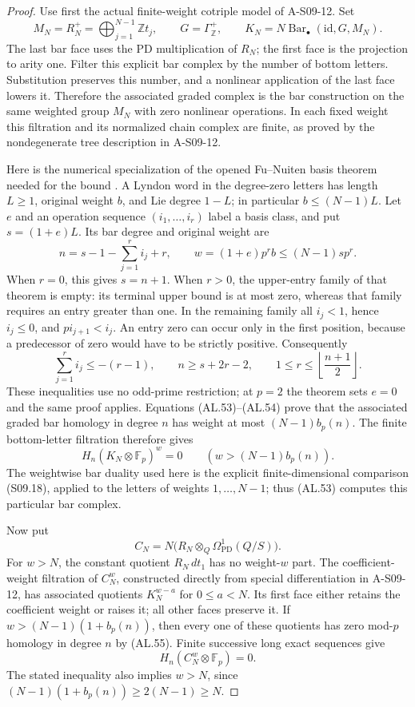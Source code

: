 \begin{proof}
Use first the actual finite-weight cotriple model
of A-S09-12.  Set
\[
 M_N=R_N^+=\bigoplus_{j=1}^{N-1}\mathbb Zt_j,
 \qquad G=\Gamma^+_{\mathbb Z},\qquad
 K_N=N\operatorname{Bar}_{\bullet}(\mathrm{id},G,M_N).
\]
The last bar face uses the PD multiplication of $R_N$;
the first face is the projection to arity one.
Filter this explicit bar complex by the number of
bottom letters.  Substitution preserves this number,
and a nonlinear application of the last face lowers
it.  Therefore the associated graded complex is the
bar construction on the same weighted group $M_N$
with zero nonlinear operations.  In each fixed
weight this filtration and its normalized chain
complex are finite, as proved by the nondegenerate
tree description in A-S09-12.

Here is the numerical specialization of the opened
Fu--Nuiten basis theorem needed for the bound
\cite[Theorem C, p.~6; Theorem 4.2, p.~40]{FuNuiten2026_check}.
A Lyndon word in the degree-zero letters has length
$L\geq1$, original weight $b$, and Lie degree $1-L$;
in particular $b\leq(N-1)L$.
Let $e$ and an operation sequence $(i_1,\ldots,i_r)$
label a basis class, and put $s=(1+e)L$.
Its bar degree and original weight are
\[
        n=s-1-\sum_{j=1}^r i_j+r,
        \qquad w=(1+e)p^r b\leq(N-1)s p^r.
 \tag{AL.53}
\]
When $r=0$, this gives $s=n+1$.
When $r>0$, the upper-entry family of that theorem
is empty: its terminal upper bound is at most zero,
whereas that family requires an entry greater than
one.  In the remaining family all $i_j<1$, hence
$i_j\leq0$, and $p i_{j+1}<i_j$.
An entry zero can occur only in the first position,
because a predecessor of zero would have to be
strictly positive.  Consequently
\[
        \sum_{j=1}^r i_j\leq-(r-1),\qquad
        n\geq s+2r-2,\qquad
        1\leq r\leq\left\lfloor\frac{n+1}{2}\right\rfloor.
 \tag{AL.54}
\]
These inequalities use no odd-prime restriction;
at $p=2$ the theorem sets $e=0$ and the same proof
applies.  Equations (AL.53)--(AL.54) prove that
the associated graded bar homology in degree $n$
has weight at most $(N-1)b_p(n)$.
The finite bottom-letter filtration therefore gives
\[
 H_n(K_N\otimes\mathbb F_p)^w=0
              \qquad(w>(N-1)b_p(n)).               \tag{AL.55}
\]
The weightwise bar duality used here is the explicit
finite-dimensional comparison (S09.18), applied to
the letters of weights $1,\ldots,N-1$; thus (AL.53)
computes this particular bar complex.

Now put
\[
 C_N=N\bigl(R_N\otimes_Q
                         \Omega^1_{\mathrm{PD}}(Q/S)\bigr).
\]
For $w>N$, the constant quotient $R_N\,dt_1$ has
no weight-$w$ part.  The coefficient-weight filtration
of $C_N^w$, constructed directly from special
differentiation in A-S09-12, has associated quotients
$K_N^{w-a}$ for $0\leq a<N$.  Its first face either
retains the coefficient weight or raises it; all
other faces preserve it.  If
$w>(N-1)(1+b_p(n))$, then every one of these
quotients has zero mod-$p$ homology in degree $n$
by (AL.55).  Finite successive long exact sequences
give
\[
             H_n(C_N^w\otimes\mathbb F_p)=0.       \tag{AL.56}
\]
The stated inequality also implies $w>N$, since
$(N-1)(1+b_p(n))\geq2(N-1)\geq N$.


\end{proof}
